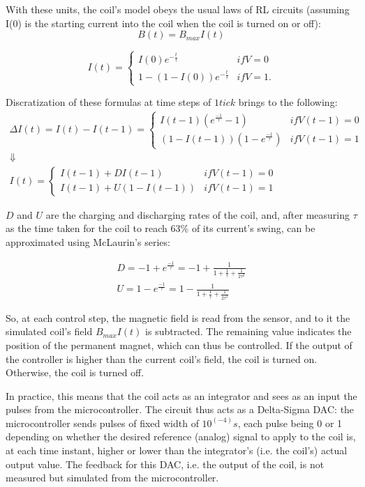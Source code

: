 With these units, the coil's model obeys the usual laws of RL circuits (assuming I(0) is the starting current into the coil when the coil is turned on or off):
\[
    B(t)=B_{max}I(t)
\]

\[
  I(t) = \left\{
    \begin{array}{lr}
      I(0)e^{-\frac{t}{\tau}} & if V = 0 \\
      1-(1-I(0))e^{-\frac{t}{\tau}} & if V = 1.
    \end{array} 
  \right.
\]


Discratization of these formulas at time steps of $1tick$ brings to the following:
\[
  \begin{array}{c}
  \Delta I(t) = I(t) - I(t-1) = \left\{
    \begin{array}{lr}
      I(t-1)(e^{\frac{-1}{\tau}}-1) & if V(t-1) = 0 \\
      (1-I(t-1))(1-e^{\frac{-1}{\tau}}) & if V(t-1) = 1
    \end{array}
  \right. \\
  \Downarrow \\
  I(t) = \left\{
    \begin{array}{lr}
      I(t-1)+DI(t-1) & if V(t-1) = 0 \\
      I(t-1)+U(1-I(t-1)) & if V(t-1) = 1
    \end{array}
  \right.
  \end{array}
\]

$D$ and $U$ are the charging and discharging rates of the coil, and, after measuring $\tau$ as the time taken for the coil to reach 63\% of its current's swing, can be approximated using McLaurin's series:

\[
  \begin{array}{c}
    D=-1+e^{\frac{-1}{\tau}}=-1+\frac{1}{1+\frac{1}{\tau}+\frac{1}{2\tau^2}} \\
    U=1-e^{\frac{-1}{\tau}}=1-\frac{1}{1+\frac{1}{\tau}+\frac{1}{2\tau^2}}
  \end{array}
\]

So, at each control step, the magnetic field is read from the sensor, and to it the simulated coil's field $B_{max}I(t)$ is subtracted. The remaining value indicates the position of the permanent magnet, which can thus be controlled. If the output of the controller is higher than the current coil's field, the coil is turned on. Otherwise, the coil is turned off.

In practice, this means that the coil acts as an integrator and sees as an input the pulses from the microcontroller. The circuit thus acts as a Delta-Sigma DAC: the microcontroller sends pulses of fixed width of $10^(-4) s$, each pulse being 0 or 1 depending on whether the desired reference (analog) signal to apply to the coil is, at each time instant, higher or lower than the integrator's (i.e. the coil's) actual output value. The feedback for this DAC, i.e. the output of the coil, is not measured but simulated from the microcontroller.

